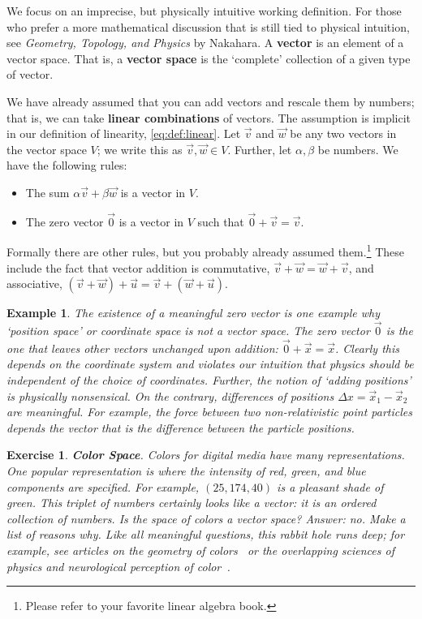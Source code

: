 \documentclass[
  11pt,
	colorful,
	raggedright,
]{tufte-style-thesis-flip}
\newtheorem{exercise}{Exercise}[section]
\newtheorem{example}{Example}[section]
\begin{document}
We focus on an imprecise, but physically intuitive working definition. For those who prefer a more mathematical discussion that is still tied to physical intuition, see \emph{Geometry, Topology, and Physics} by Nakahara. A \textbf{vector} is an element of a vector space. That is, a \textbf{vector space} is the `complete' collection of a given type of vector. 

We have already assumed that you can add vectors and rescale them by numbers; that is, we can take \textbf{linear combinations} of vectors. The assumption is implicit in our definition of linearity, \eqref{eq:def:linear}. Let $\vec{v}$ and $\vec{w}$ be any two vectors in the vector space $V$; we write this as $\vec{v},\vec{w}\in V$. Further, let $\alpha, \beta$ be numbers. We have the following rules:
\begin{itemize}
  \item The sum $\alpha\vec v + \beta\vec w$ is a vector in $V$. 
  \item The zero vector $\vec 0$ is a vector in $V$ such that $\vec 0 + \vec v = \vec v$. 
\end{itemize}
Formally there are other rules, but you probably already assumed them.\footnote{Please refer to your favorite linear algebra book.} These include the fact that vector addition is commutative, $\vec v + \vec w = \vec w + \vec v$, and associative, $(\vec v + \vec w) + \vec u = \vec v + (\vec w + \vec u)$. 
\begin{example}
The existence of a meaningful zero vector is one example why `position space' or coordinate space is not a vector space. The zero vector $\vec 0$ is the one that leaves other vectors unchanged upon addition: $\vec 0 + \vec x = \vec x$. Clearly this depends on the coordinate system and violates our intuition that physics should be independent of the choice of coordinates. Further, the notion of `adding positions' is physically nonsensical. On the contrary, differences of positions $\Delta{x} = \vec{x}_1-\vec{x}_2$ \emph{are} meaningful. For example, the force between two non-relativistic point particles depends the vector that is the difference between the particle positions.
\end{example}

\begin{exercise}\label{ex:color:space} \textbf{Color Space}. Colors for digital media have many representations. One popular representation is  where the intensity of red, green, and blue components are specified. For example, $(25,174,40)$ is a pleasant shade of green. This triplet of numbers certainly looks like a vector: it is an ordered collection of numbers. Is the space of  colors a vector space? \emph{Answer: no. Make a list of reasons why.} Like all meaningful questions, this rabbit hole runs deep; for example, see articles on the geometry of colors~ or the overlapping sciences of physics and neurological perception of color~.
\end{exercise}
\end{document}
